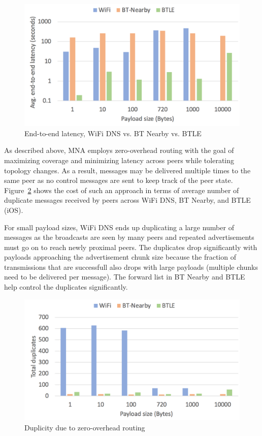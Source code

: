 \documentclass[conference]{IEEEtran}
\begin{document}
\begin{figure}[htbp]
\centerline{\includegraphics[width=0.8\columnwidth]{figs/e2e_latency}}
\caption{End-to-end latency, WiFi DNS vs. BT Nearby vs. BTLE}
\label{fig:e2e}
\end{figure}

As described above, MNA employs zero-overhead routing with the goal of
maximizing coverage and minimizing latency across peers while
tolerating topology changes.  As a result, messages may be delivered
multiple times to the same peer as no control messages are sent to
keep track of the peer state.  Figure~\ref{fig:dup} shows the cost of
such an approach in terms of average number of duplicate messages
received by peers across WiFi DNS, BT Nearby, and BTLE (iOS). 

For small payload sizes, WiFi DNS ends up duplicating a large number
of messages as the broadcasts are seen by many peers and repeated
advertisements must go on to reach newly proximal peers. The
duplicates drop significantly with payloads approaching the
advertisement chunk size because the fraction of transmissions that
are successfull also drops with large payloads (multiple chunks need
to be delivered per message). The forward list in BT Nearby and BTLE
help control the duplicates significantly.

\begin{figure}[htbp]
\centerline{\includegraphics[width=0.8\columnwidth]{figs/duplicates}}
\caption{Duplicity due to zero-overhead routing}
\label{fig:dup}
\end{figure}
\end{document}
